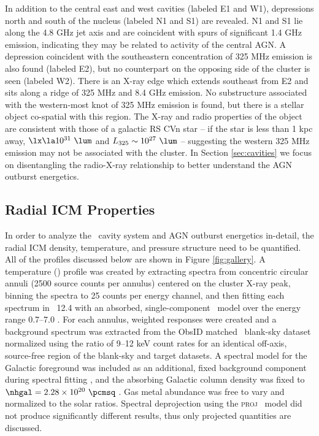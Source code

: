 \documentclass[iop]{emulateapj}
\begin{document}
In addition to the central east and west cavities (labeled E1 and W1),
depressions north and south of the nucleus (labeled N1 and S1) are
revealed. N1 and S1 lie along the 4.8 GHz jet axis and are coincident
with spurs of significant 1.4 GHz emission, indicating they may be
related to activity of the central AGN. A depression coincident with
the southeastern concentration of 325 MHz emission is also found
(labeled E2), but no counterpart on the opposing side of the cluster
is seen (labeled W2). There is an X-ray edge which extends southeast
from E2 and sits along a ridge of 325 MHz and 8.4 GHz emission. No
substructure associated with the western-most knot of 325 MHz emission
is found, but there is a stellar object co-spatial with this region.
The X-ray and radio properties of the object are consistent with those
of a galactic RS CVn star \citep{1993RPPh...56.1145S} -- if the star
is less than 1 kpc away, $\lx \la 10^{31} ~\lum$ and $L_{325} \sim
10^{27} ~\lum$ -- suggesting the western 325 MHz emission may not be
associated with the cluster. In Section \ref{sec:cavities} we focus on
disentangling the radio-X-ray relationship to better understand the
AGN outburst energetics.

\subsection{Radial ICM Properties}
\label{sec:icm}

In order to analyze the \rbs\ cavity system and AGN outburst
energetics in-detail, the radial ICM density, temperature, and
pressure structure need to be quantified. All of the profiles
discussed below are shown in Figure \ref{fig:gallery}. A temperature
(\tx) profile was created by extracting spectra from concentric
circular annuli (2500 source counts per annulus) centered on the
cluster X-ray peak, binning the spectra to 25 counts per energy
channel, and then fitting each spectrum in \xspec\ 12.4 \citep{xspec}
with an absorbed, single-component \mekal\ model \citep{mekal1} over
the energy range 0.7--7.0 \keV. For each annulus, weighted responses
were created and a background spectrum was extracted from the ObsID
matched \caldb\ blank-sky dataset normalized using the ratio of 9--12
keV count rates for an identical off-axis, source-free region of the
blank-sky and target datasets. A spectral model for the Galactic
foreground was included as an additional, fixed background component
during spectral fitting \citep[see][for method]{2005ApJ...628..655V,
  xrayband}, and the absorbing Galactic column density was fixed to
$\nhgal = 2.28 \times 10^{20} ~\pcmsq$ \citep{lab}. Gas metal
abundance was free to vary and normalized to the \citet{ag89} solar
ratios. Spectral deprojection using the {\textsc{proj}} \xspec\ model
did not produce significantly different results, thus only projected
quantities are discussed.
\end{document}
